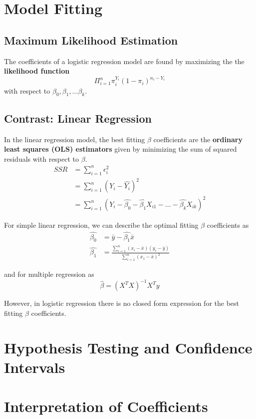 \documentclass[]{article}
\begin{document}
\section{Model Fitting}
\subsection{Maximum Likelihood Estimation}
The coefficients of a logistic regression model are found by maximizing the the \textbf{likelihood function}
\[\Pi^n_{i=1} \pi_i^{Y_i}(1-\pi_i)^{n_i-Y_i}\]
with respect to $\beta_0, \beta_1, ... \beta_k$.

\subsection{Contrast: Linear Regression}
In the linear regression model, the best fitting $\beta$ coefficients are the \textbf{ordinary least squares (OLS) estimators} given by minimizing the sum of squared residuals with respect to $\beta$.
\[
\begin{aligned}
SSR
&= \sum^n_{i=1} \epsilon_i^2 \\
&= \sum^n_{i=1} (Y_i - \hat{Y_i})^2 \\
&= \sum^n_{i=1} (Y_i - \hat{\beta_0} - \hat{\beta_1}X_{i1} - ... - \hat{\beta_k}X_{ik})^2
\end{aligned}\]

For simple linear regression, we can describe the optimal fitting $\beta$ coefficients as
\[\begin{aligned}
\hat{\beta_0} &= \bar{y} - \hat{\beta_1}\bar{x} \\
\hat{\beta_1} &= \frac{\sum^n_{i=1}(x_i - \bar{x})(y_i - \bar{y})}{
	\sum^n_{i=1}(x_1 - \bar{x})^2}
\end{aligned}\]

and for multiple regression as
\[
\hat{\beta} = (X^TX)^{-1}X^Ty
\]

However, in logistic regression there is no closed form expression for the best fitting $\beta$ coefficients.
\section{Hypothesis Testing and Confidence Intervals}

\section{Interpretation of Coefficients}

\pagebreak


\end{document}
